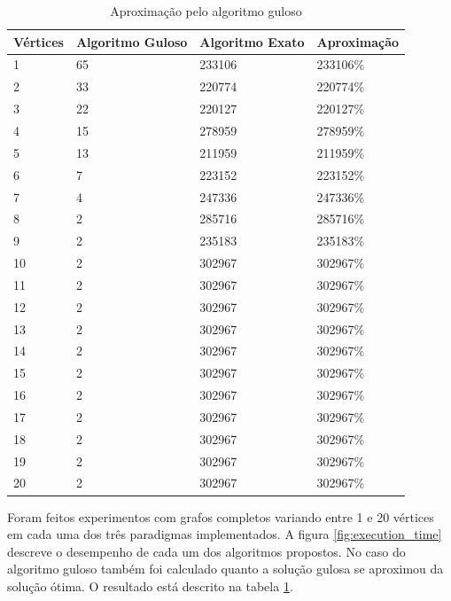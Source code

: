 \documentclass{article}
\begin{document}
\begin{table}
\centering
\begin{tabular}{ |l|l|l|l| }
  \hline
  Vértices & Algoritmo Guloso & Algoritmo Exato & Aproximação \\
  \hline
  1  & 65               & 233106 & 233106\% \\
  2  & 33               & 220774 & 220774\% \\
  3  & 22               & 220127 & 220127\% \\               
  4  & 15               & 278959 & 278959\% \\               
  5  & 13               & 211959 & 211959\% \\              
  6  & 7                & 223152 & 223152\% \\               
  7  & 4                & 247336 & 247336\% \\               
  8  & 2                & 285716 & 285716\% \\               
  9  & 2                & 235183 & 235183\% \\
  10 & 2                & 302967 & 302967\% \\               
  11 & 2                & 302967 & 302967\% \\               
  12 & 2                & 302967 & 302967\% \\               
  13 & 2                & 302967 & 302967\% \\               
  14 & 2                & 302967 & 302967\% \\               
  15 & 2                & 302967 & 302967\% \\               
  16 & 2                & 302967 & 302967\% \\               
  17 & 2                & 302967 & 302967\% \\               
  18 & 2                & 302967 & 302967\% \\               
  19 & 2                & 302967 & 302967\% \\               
  20 & 2                & 302967 & 302967\% \\               
  \hline
\end{tabular}
\caption{Aproximação pelo algoritmo guloso}
\label{tab:greedy_approximation}
\end{table}

Foram feitos experimentos com grafos completos variando entre 1 e 20 vértices em cada uma dos três paradigmas implementados. A figura
\ref{fig:execution_time} descreve o desempenho de cada um dos algoritmos propostos. No caso do algoritmo guloso também foi 
calculado quanto a solução gulosa se aproximou da solução ótima. O resultado está descrito na tabela \ref{tab:greedy_approximation}.
\end{document}
